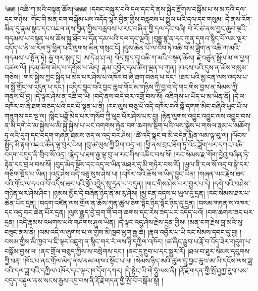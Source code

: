 \setcounter{footnote}{0} 
༄༅། །འཆི་ཀ་མའི་བསྟན་ཆོས།༄༅༅། །དབང་བསྐུར་བའི་དལ་དང་དེ་ནས་སྐྱེད་རྫོགས་བསྒོམ་པ་ས་མ་ཏའི་དལ་དང་གཉིས། གོང་གི་མན་ངག་བསྒོམ་པས་འདོད་ལྷར་བྱིན་གྱིས་བརླབས་པ་སྤྲུལ་པའི་དལ་དང་གསུམ། དེ་ནས་འོག་མིན་དུ་རྣམ་སྣང་དང་འཇལ་ནས་བྱིན་གྱིས་བརླབས་པ་རང་བཞིན་གྱི་དལ་དང་བཞི། བེ་རོ་ཙ་ནས་བྱང་ཆུབ་ལྔའི་གདམས་པ་བསྟན་པས་ཆོས་སྐུ་ཐོབ་པ་དོན་དམ་པའི་དལ་དང་ལྔའོ། །བུདྡྷ་ཛྙ་ན་དང་ཀུན་དགའ་སྙིང་པོ་ལམ་ལྔར་འདོད་པ་ནི་ཕ་རོལ་ཏུ་ཕྱིན་པའི་ལུགས་མིན་གསུང་ངོ། །དུས་ཆེན་པོ་ལ་བབ་ཏེ་འཆི་བ་མ་ཟློག་ན་འཆི་ཀ་མའི་གདམས་པ་སྟོན་ཏེ། རྒྱ་གར་སྐད་དུ། ཨ་དེ་ཤ་ཤ་ན། བོད་སྐད་དུ།འཆི་ཀ་མའི་བསྟན་ཆོས། རྗེ་བཙུན་སྒྲོལ་མ་ལ་ཕྱག་འཚལ་ལོ། །དམ་ཚིག་མེད་པ་དགོས་པ་མེད། རྣམ་འབྱོར་དམ་ཚིག་ལྡན་པ་ཀུན། །འདས་པའི་དུས་ན་ཆོས་གསུམ་གཅེས། །གར་སྐྱེས་ཀྱང་སྐྱིད་པ་མེད་པར་ཤེས་པ་འཁོར་བ་ཞེ་ཐག་བཅད་པ་དང་། །ཐར་པའི་མྱ་ངན་ལས་འདས་པ་ལ་སྤྲོ་གྲོང་ལ་འདུན་པ་དང་། །འདིར་བྱང་བའི་བྱང་ཆུབ་གོང་མ་གཉིས་ཀྱི་བྱ་བ་དེ་གང་གིས་བྱས་ན་སེམས་ཀྱི་གནས་པོ་བྱ། །དེ་ལྟར་ཤེས་ན་འཆི་བ་ཡི། །བདེ་ནས་བདེ་བར་འགྲོ་བས་སོ། འཇིགས་པ་ཡོད་པ་མ་ཡིན་ནོ། །དེ་ལ་འཁོར་བ་ཞེ་ཐག་བཅད་པའི་དང་པོ་སྟན་པ་ནི། །རང་ལུས་བཅུ་པོ་འདི་འཁོར་བའི་སྒོ་དགག་མིང་བཞིའི་ཕུང་པོ་ལ་གཟུགས་དང་ལྔ་ལ། །སྙིང་པཌྷོ་མེད་པར་གསོབ་ཀྱི་ཕུང་པོར་ཤེས་པར་བྱ། །རྟེན་ལུགས་འབྱུང་འབྱུང་ལས་འབྱུང་བས་ན་མི་དགེ་བ་མ་སྐྱེས་པ་མི་སྐྱེ་སྐྱེས་པ་ཡང་འགགས་རྐྱེན་བག་ཆགས་སྡིག་པའི་ལས་སྐྱེས་པ་གསལ་རྣམ་པ་མཆོག།ཧ་ལའི་དུག་དང་བདག་གཞན་ཐམས་ཅད་ལ་འདྲ་བར་ཤེས། །ཚེ་འདི་སྣང་བ་མི་བདེན་རྨིན་ལམ་ལྟ་བུ་ལ། །ལོངས་སྤྱོད་མི་རྟག་འཇའ་ཚོན་ལྟ་བུར་ངེས། །བུ་ཚ་ལུས་ཀྱི་ཤིག་འདྲ་ལ། །ཕྱི་ནས་བྲང་ཐོག་ཏུ་འོང་ཟློག་པར་དཀའ་འཆི་བདག་བདུད་ནི་གྲིབ་སོ་འདྲ། །རྙེད་པ་ཐག་རྒྱ་ལྟ་བུ་ལ་རང་གིས་འཆིང་བས་སོ། །རང་སེམས་རྫ་གོག་བྱེའུ་བཞིན་ཏེ་རྟེན་དང་བྲལ་བས་སོ། །བུད་མེད་སྔོས་དང་འདྲ་བ་ཡིན་མཐར་དུ་མི་གཏེར་བས་སོ། །ཡུལ་ནི་ངལ་སོ་འདྲ་བ་སྟེ་དར་གཅིག་སྡོད་པ་ཡིན། །འདུ་ཤེས་འདི་བཅུ་སུས་ཤེས་པ། །འཁོར་བའི་ཆོས་ལ་ཡིད་བྱུང་ཡིན། །གཞན་ཡང་རྗེས་ཐར་བའི་གྲོང་ལ་དཔའ་བོ་འདིས་ཐར་པའི་སྒོ་འབྱེད་སུ་དྲན་པ་བདུན། །གང་གིས་ཤེས་པར་གྱུར་པ་དེ། །དགེ་བའི་བཤེས་གཉེན་ཕར་ཤེས་ཤིང་། །ཉམས་མྱོང་དེ་བཞིན་ཉིད་ནི་མ་རུ་ཤེས། །མྱ་ངན་འདས་པ་ཡུལ་དུ་དྲན། །རང་སེམས་ཐར་པ་ཆེན་པོར་དྲན། །བདག་འཛིན་ལས་གྲོལ་ན་ཆོས་ཀུན་ཚུལ་ཅིག་སྟོང་ཉིད་སྟོང་ཉིད་དུ་དྲན། །བསམ་གཏན་ས་འཁར་དང་འདྲ་བར་ཆེན་པོར་དྲན། །ལུས་རྒྱུད་བྱེ་བྲག་གི་བག་ཆགས་དང་རེས་ཟད་པར་འདོད་པའོ། །བག་ཆགས་ཟད་པར་དྲན། །འདི་རྣམས་འཕགས་པའི་གཤེགས་ཤུལ་ཡིན། །དེ་ལྟར་འདུ་ཤེས་རྗེས་དྲན་གྱིས། །མན་ངག་རྗེས་བླ་མའི་སུ་བཟུང་ནས་ནི། །ལམ་འདི་ལ་ཞུགས་པ་ལ་གྱིས་མི་ཁྱབ་ཕྱག་རྒྱ་ཆེ། །རྣལ་འབྱོར་པ་ཡི་རང་སེམས་དབང་དུ་བྱ། །བསམ་གྱིས་མི་ཁྱབ་པ་ཇི་ལྟར་འཇུག་ན་སྙིང་གར་རཾ་ལས་ཉི་དཀྱིལ་འཁོར། །ཚ་ཞིང་རྩུབ་པ་རྣོ་བ་འོད་ཟེར་གདུག་པ་བསྒོམ་བྱས་ལ། །ནང་གྲོལ་བཅུད་ཀྱིས་ས་བསྲེགས་དང་། །ནང་དུ་རྔུབ་པ་དང་སྦྱར་རོ། །ཐལ་བ་ཐུར་སེམས་དབུགས་ཀྱི་བརྡ། །ཁོང་པ་ནང་གྲོལ་མེད་ནས་ནམ་མཁའ་སྟོང་པ་ལ། །སེམས་ཉིད་ཨའི་ཚུལ་དུ་བྱང་ཆུབ་ཨ་ཡི་དངོས་ལས་ཟླ་བའི་དལ་ཟླ་བའི་དཀྱིལ་འཁོར་དང་ལྟར་ཁ་དོག་དཀར། །དེ་སྟེང་ཡི་གེ་ཧཱུཾ་ལས་ནི། །རྡོ་རྗེ་གདན་གྱི་སྤོ་ཤཱཀྱ་ཐུབ་པས་བདུད་བརྟུལ་ནས་སངས་རྒྱས་འདྲ་བས་ནི་རྡོ་རྗེ་གདན་གྱི་སྤོ་བོ་བསྒོམ་སྟེ། །

